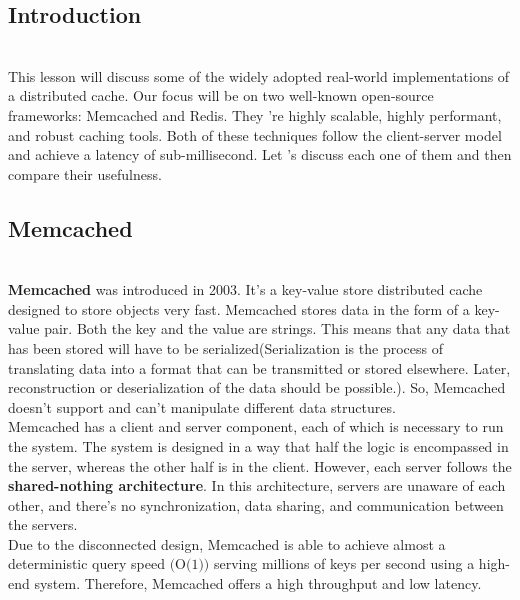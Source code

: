 

\subsection{Introduction}\label{aZ2TKwPuDVp4vDxetsgtn}
\\
This lesson will discuss some of the widely adopted real-world implementations of a distributed cache. Our focus will be on two well-known open-source frameworks: Memcached and Redis. They 're highly scalable, highly performant, and robust caching tools. Both of these techniques follow the client-server model and achieve a latency of sub-millisecond. Let
's discuss each one of them and then compare their usefulness.

\subsection{Memcached}\label{TggiGXZeug4q4Yn5P4W4L}
\\
\textbf{Memcached} was introduced in 2003. It's a key-value store distributed cache designed to store objects very fast. Memcached stores data in the form of a key-value pair. Both the key and the value are strings. This means that any data that has been stored will have to be serialized(Serialization is the process of translating data into a format that can be transmitted or stored elsewhere. Later, reconstruction or deserialization of the data should be possible.). So, Memcached doesn't support and can't manipulate different data structures.
\\
Memcached has a client and server component, each of which is necessary to run the system. The system is designed in a way that half the logic is encompassed in the server, whereas the other half is in the client. However, each server follows the \textbf{shared-nothing architecture}. In this architecture, servers are unaware of each other, and there's no synchronization, data sharing, and communication between the servers.
\\
Due to the disconnected design, Memcached is able to achieve almost a deterministic query speed \protect{}\label{katex_inline_75gjssGxgsScR4N9UCJJb}{{{\(\text{(O(1))}\)}}} serving millions of keys per second using a high-end system. Therefore, Memcached offers a high throughput and low latency.

